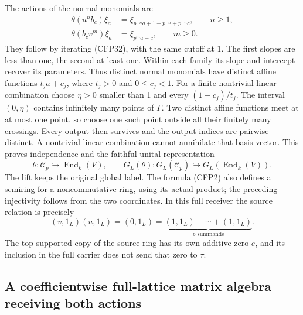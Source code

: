 The actions of the normal monomials are
\begin{equation}\tag{CFP36}
\begin{aligned}
 \theta(u^nb_c)\xi_a
    &=\xi_{p^{-n}a+1-p^{-n}+p^{-n}c},\qquad n\ge1,\\
 \theta(b_cv^m)\xi_a&=\xi_{p^m a+c},\qquad m\ge0.
\end{aligned}
\end{equation}
They follow by iterating (CFP32), with the
same cutoff at 1. The first slopes are less
than one, the second at least one. Within
each family its slope and intercept recover
its parameters. Thus distinct normal monomials
have distinct affine functions $t_ja+c_j$,
where $t_j>0$ and $0\le c_j<1$.
For a finite nontrivial linear combination
choose $\eta>0$ smaller than 1 and every
$(1-c_j)/t_j$. The interval $(0,\eta)$
contains infinitely many points of $\Gamma$.
Two distinct affine functions meet at at
most one point, so choose one such point
outside all their finitely many crossings.
Every output then survives and the output
indices are pairwise distinct. A nontrivial
linear combination cannot annihilate that
basis vector. This proves independence and
the faithful unital representation
\begin{equation}\tag{CFP37}
 \theta:\mathcal C_p\hookrightarrow\operatorname{End}_k(V),
 \qquad
 G_L(\theta):G_L(\mathcal C_p)
                 \hookrightarrow G_L(\operatorname{End}_k(V)).
\end{equation}
The lift keeps the original global label.
The formula (CFP2) also defines a semiring
for a noncommutative ring, using its actual
product; the preceding injectivity follows
from the two coordinates. In this full
receiver the source relation is precisely
\begin{equation}\tag{CFP38}
 (v,1_L)(u,1_L)=(0,1_L)
       =\underbrace{(1,1_L)+\cdots+(1,1_L)}_{p\text{ summands}}.
\end{equation}
The top-supported copy of the source ring
has its own additive zero $e$, and its
inclusion in the full carrier does not
send that zero to $\tau$.

\subsection{A coefficientwise full-lattice matrix algebra receiving both actions}

